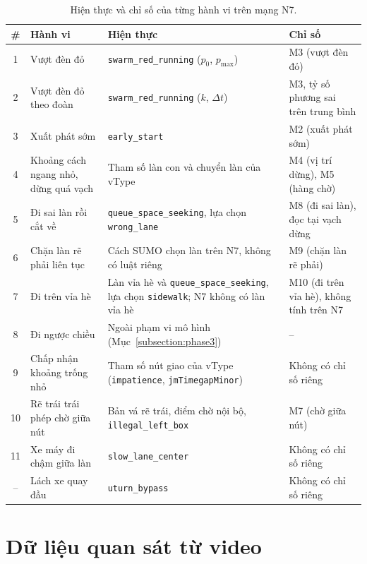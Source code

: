 \documentclass[../main.tex]{subfiles}
\begin{document}
\begin{table}[!htbp]
\centering
\small\setlength{\tabcolsep}{3pt}
\caption{Hiện thực và chỉ số của từng hành vi trên mạng N7.}
\label{table:3.1}
\begin{tabular}{|c|>{\raggedright\arraybackslash}p{3.4cm}|>{\raggedright\arraybackslash}p{4.9cm}|>{\raggedright\arraybackslash}p{4.6cm}|}
\hline
\textbf{\#} & \textbf{Hành vi} & \textbf{Hiện thực} & \textbf{Chỉ số} \\ \hline
1 & Vượt đèn đỏ & \texttt{swarm\_red\_running} ($p_0$, $p_{\max}$) & M3 (vượt đèn đỏ) \\ \hline
2 & Vượt đèn đỏ theo đoàn & \texttt{swarm\_red\_running} ($k$, $\Delta t$) & M3, tỷ số phương sai trên trung bình \\ \hline
3 & Xuất phát sớm & \texttt{early\_start} & M2 (xuất phát sớm) \\ \hline
4 & Khoảng cách ngang nhỏ, dừng quá vạch & Tham số làn con và chuyển làn của vType & M4 (vị trí dừng), M5 (hàng chờ) \\ \hline
5 & Đi sai làn rồi cắt về & \texttt{queue\_space\_seeking}, lựa chọn \texttt{wrong\_lane} & M8 (đi sai làn), đọc tại vạch dừng \\ \hline
6 & Chặn làn rẽ phải liên tục & Cách SUMO chọn làn trên N7, không có luật riêng & M9 (chặn làn rẽ phải) \\ \hline
7 & Đi trên vỉa hè & Làn vỉa hè và \texttt{queue\_space\_seeking}, lựa chọn \texttt{sidewalk}; N7 không có làn vỉa hè & M10 (đi trên vỉa hè), không tính trên N7 \\ \hline
8 & Đi ngược chiều & Ngoài phạm vi mô hình (Mục~\ref{subsection:phase3}) & -- \\ \hline
9 & Chấp nhận khoảng trống nhỏ & Tham số nút giao của vType (\texttt{impatience}, \texttt{jmTimegapMinor}) & Không có chỉ số riêng \\ \hline
10 & Rẽ trái trái phép chờ giữa nút & Bản vá rẽ trái, điểm chờ nội bộ, \texttt{illegal\_left\_box} & M7 (chờ giữa nút) \\ \hline
11 & Xe máy đi chậm giữa làn & \texttt{slow\_lane\_center} & Không có chỉ số riêng \\ \hline
-- & Lách xe quay đầu & \texttt{uturn\_bypass} & Không có chỉ số riêng \\ \hline
\end{tabular}
\end{table}

\section{Dữ liệu quan sát từ video}
\label{section:3.6}
\end{document}
